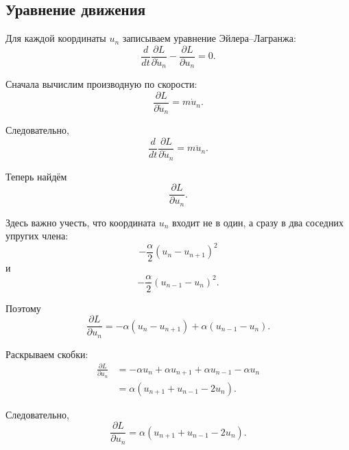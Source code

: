 \documentclass[../final.tex]{subfiles}
\begin{document}
\subsection*{Уравнение движения}

Для каждой координаты $u_n$ записываем
уравнение Эйлера--Лагранжа:
%
\begin{equation*}
    \frac{d}{dt}
    \frac{\partial L}{\partial\dot u_n}
    -
    \frac{\partial L}{\partial u_n}
    =
    0.
\end{equation*}

Сначала вычислим производную по скорости:
%
\begin{equation*}
    \frac{\partial L}{\partial\dot u_n}
    =
    m\dot u_n.
\end{equation*}

Следовательно,
%
\begin{equation*}
    \frac{d}{dt}
    \frac{\partial L}{\partial\dot u_n}
    =
    m\ddot u_n.
\end{equation*}

Теперь найдём
%
\begin{equation*}
    \frac{\partial L}{\partial u_n}.
\end{equation*}

Здесь важно учесть, что координата $u_n$ входит
не в один, а сразу в два соседних упругих члена:
%
\begin{equation*}
    -\frac{\alpha}{2}
    (u_n-u_{n+1})^2
\end{equation*}
%
и
%
\begin{equation*}
    -\frac{\alpha}{2}
    (u_{n-1}-u_n)^2.
\end{equation*}

Поэтому
%
\begin{equation*}
    \frac{\partial L}{\partial u_n}
    =
    -\alpha(u_n-u_{n+1})
    +
    \alpha(u_{n-1}-u_n).
\end{equation*}

Раскрываем скобки:
%
\begin{align*}
    \frac{\partial L}{\partial u_n}
    &=
    -\alpha u_n
    +
    \alpha u_{n+1}
    +
    \alpha u_{n-1}
    -
    \alpha u_n
    \\
    &=
    \alpha
    \left(
        u_{n+1}
        +
        u_{n-1}
        -
        2u_n
    \right).
\end{align*}

Следовательно,
%
\begin{equation*}
    \boxed{
        \frac{\partial L}{\partial u_n}
        =
        \alpha
        \left(
            u_{n+1}
            +
            u_{n-1}
            -
            2u_n
        \right)
    }.
\end{equation*}
\end{document}
